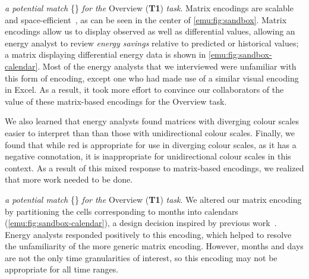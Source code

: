 
 {\it a potential match} \{\posmatch\} {\it for the} Overview ({\bf T1}) {\it task}.
Matrix encodings are scalable and space-efficient~\cite{Goodwin2013,Hao2007}, as can be seen in the center of \autoref{emu:fig:sandbox}.
Matrix encodings allow us to display observed as well as differential values, allowing an energy analyst to review {\it energy savings} relative to predicted or historical values; a matrix displaying differential energy data is shown in \autoref{emu:fig:sandbox-calendar}. 
Most of the energy analysts that we interviewed were unfamiliar with this form of encoding, except one who had made use of a similar visual encoding in Excel. 
As a result, it took more effort to convince our collaborators of the value of these matrix-based encodings for the Overview task.

We also learned that energy analysts found matrices with diverging colour scales easier to interpret than than those with unidirectional colour scales. 
Finally, we found that while red is appropriate for use in diverging colour scales, as it has a negative connotation, it is inappropriate for unidirectional colour scales in this context. 
As a result of this mixed response to matrix-based encodings, we realized that more work needed to be done.

 {\it a potential match} \{\posmatch\} {\it for the} Overview ({\bf T1}) {\it task}.
We altered our matrix encoding by partitioning the cells corresponding to months into calendars (\autoref{emu:fig:sandbox-calendar}), a design decision inspired by previous work~\cite{Lammarsch2009,VanWijk1999}. 
Energy analysts responded positively to this encoding, which helped to resolve the unfamiliarity of the more generic matrix encoding. 
However, months and days are not the only time granularities of interest, so this encoding may not be appropriate for all time ranges.


